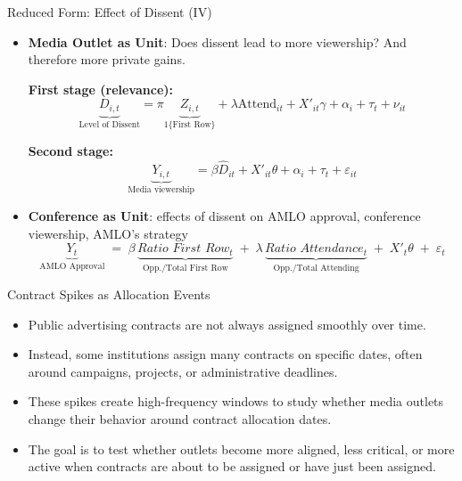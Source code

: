 \documentclass[10pt,aspectratio=169]{beamer}
\begin{document}
\begin{frame}{Reduced Form: Effect of Dissent (IV)}
\small
\begin{itemize}
    \item \textbf{Media Outlet as Unit}: Does dissent lead to more viewership? And therefore more private gains.

\textbf{First stage (relevance):}
\[
\underbrace{ D_{i,t}}_{\text{Level of Dissent}} = \pi \underbrace{ Z_{i,t}}_{\text{1\{First Row\}}} + \lambda \text{Attend}_{it} + X'_{it}\gamma + \alpha_i + \tau_t + \nu_{it}
\]

\textbf{Second stage:}
\[
\underbrace{ Y_{i,t}}_{\text{Media viewership}} = \beta \widehat{D}_{it} + X'_{it}\theta + \alpha_i + \tau_t + \varepsilon_{it}
\]
\end{itemize}

\vspace{0.5em}


\begin{itemize}
    \item \textbf{Conference as Unit}: effects of dissent on AMLO approval, conference viewership, AMLO's strategy
\[
\underbrace{ Y_{t}}_{\text{AMLO Approval}}
\;=\;
\beta\,\underbrace{ \textit{Ratio First Row}_{t}}_{\text{Opp./Total First Row}}
\;+\;
\lambda\,\underbrace{ \textit{Ratio Attendance}_{t}}_{\text{Opp./Total Attending}}
\;+\;
X'_{t}\theta
\;+\;
\varepsilon_{t}
\]
\end{itemize}
\end{frame}

\begin{frame}{Contract Spikes as Allocation Events}
\small
\begin{itemize}\setlength\itemsep{0.7em}
    \item Public advertising contracts are not always assigned smoothly over time.
    
    \item Instead, some institutions assign many contracts on specific dates, often around campaigns, projects, or administrative deadlines.
    
    \item These spikes create high-frequency windows to study whether media outlets change their behavior around contract allocation dates.
    
    \item The goal is to test whether outlets become more aligned, less critical, or more active when contracts are about to be assigned or have just been assigned.
\end{itemize}

\vspace{0.5em}

\end{frame}
\end{document}
